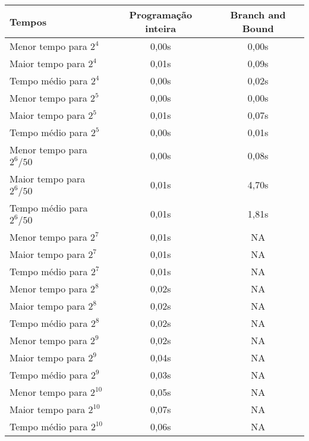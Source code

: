 \documentclass{article}
\begin{document}
\begin{center}
  \bgroup {}
  \begin{table}
    \begin{tabular}{| l | c | c |}
      \hline Tempos & Programação inteira & Branch and Bound \\ \hline
      \hline Menor tempo para $2^4$ & 0,00s & 0,00s \\ Maior tempo
      para $2^4$ & 0,01s & 0,09s \\ Tempo médio para $2^4$ & 0,00s &
                                                                     0,02s \\ \hline

      Menor tempo para $2^5$ & 0,00s & 0,00s \\ Maior tempo para $2^5$
                    & 0,01s & 0,07s \\ Tempo médio para $2^5$ & 0,00s & 0,01s
      \\ \hline

      Menor tempo para $2^6/50$ & 0,00s & 0,08s \\ Maior tempo para
      $2^6/50$ & 0,01s & 4,70s \\ Tempo médio para $2^6/50$ & 0,01s &
                                                                     1,81s \\ \hline

      Menor tempo para $2^7$ & 0,01s & NA \\ Maior tempo para $2^7$ &
                                                                      0,01s & NA \\ Tempo médio para $2^7$ & 0,01s & NA \\ \hline

      Menor tempo para $2^8$ & 0,02s & NA \\ Maior tempo para $2^8$ &
                                                                      0,02s & NA \\ Tempo médio para $2^8$ & 0,02s & NA \\ \hline

      Menor tempo para $2^9$ & 0,02s & NA \\ Maior tempo para $2^9$ &
                                                                      0,04s & NA \\ Tempo médio para $2^9$ & 0,03s & NA \\ \hline

      Menor tempo para $2^{10}$ & 0,05s & NA \\ Maior tempo para
      $2^{10}$ & 0,07s & NA \\ Tempo médio para $2^{10}$ & 0,06s & NA
      \\ \hline


\end{tabular}
\end{table}
\end{center}
\end{document}
